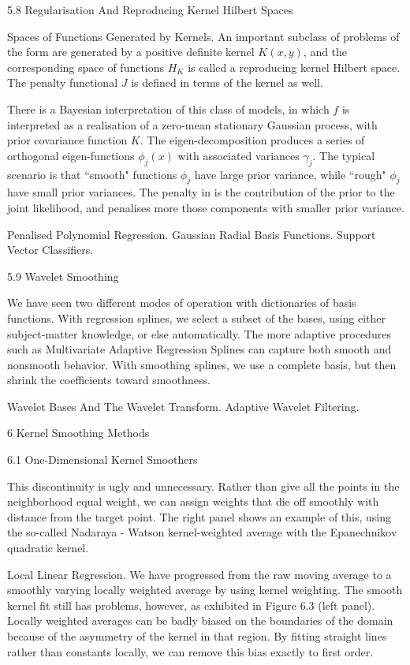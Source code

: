 5.8 Regularisation And Reproducing Kernel Hilbert Spaces

Spaces of Functions Generated by Kernels. An important subclass of problems of the form are generated by a positive definite kernel $K(x,y)$, and the corresponding space of functions $H_K$ is called a reproducing kernel Hilbert space. The penalty functional $J$ is defined in terms of the kernel as well.

There is a Bayesian interpretation of this class of models, in which $f$ is interpreted as a realisation of a zero-mean stationary Gaussian process, with prior covariance function $K$. The eigen-decomposition produces a series of orthogonal eigen-functions $\phi_j (x)$ with associated variances $\gamma_j$. The typical scenario is that ``smooth" functions $\phi_j$ have large prior variance, while ``rough" $\phi_j$ have small prior variances. The penalty in is the contribution of the prior to the joint likelihood, and penalises more those components with smaller prior variance.

Penalised Polynomial Regression. Gaussian Radial Basis Functions. Support Vector Classifiers.

5.9 Wavelet Smoothing

We have seen two different modes of operation with dictionaries of basis functions. With regression splines, we select a subset of the bases, using either subject-matter knowledge, or else automatically. The more adaptive procedures such as Multivariate Adaptive Regression Splines can capture both smooth and nonsmooth behavior. With smoothing splines, we use a complete basis, but then shrink the coefficients toward smoothness.

Wavelet Bases And The Wavelet Transform. Adaptive Wavelet Filtering.

6 Kernel Smoothing Methods

6.1 One-Dimensional Kernel Smoothers

This discontinuity is ugly and unnecessary. Rather than give all the points in the neighborhood equal weight, we can assign weights that die off smoothly with distance from the target point. The right panel shows an example of this, using the so-called Nadaraya - Watson kernel-weighted average with the Epanechnikov quadratic kernel.

Local Linear Regression. We have progressed from the raw moving average to a smoothly varying locally weighted average by using kernel weighting. The smooth kernel fit still has problems, however, as exhibited in Figure 6.3 (left panel). Locally weighted averages can be badly biased on the boundaries of the domain because of the asymmetry of the kernel in that region. By fitting straight lines rather than constants locally, we can remove this bias exactly to first order.

